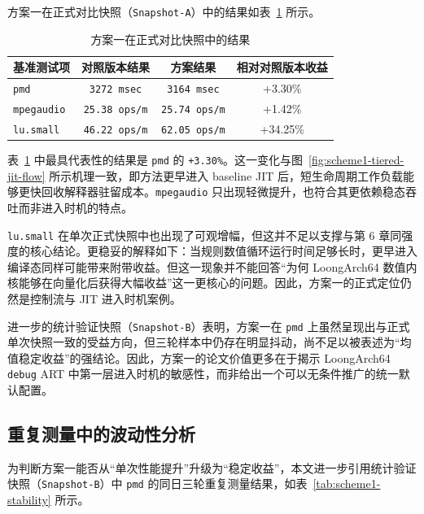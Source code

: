 方案一在正式对比快照（\texttt{Snapshot-A}）中的结果如表~\ref{tab:scheme1-result} 所示。

\begin{table}[htbp]
    \centering
    \small
    \caption{方案一在正式对比快照中的结果}
    \label{tab:scheme1-result}
    \begin{tabular}{lccc}
        \hline
        \textbf{基准测试项} & \textbf{对照版本结果} & \textbf{方案结果} & \textbf{相对对照版本收益} \\
        \hline
        \texttt{pmd} & \texttt{3272\,msec} & \texttt{3164\,msec} & +3.30\% \\
        \texttt{mpegaudio} & \texttt{25.38\,ops/m} & \texttt{25.74\,ops/m} & +1.42\% \\
        \texttt{lu.small} & \texttt{46.22\,ops/m} & \texttt{62.05\,ops/m} & +34.25\% \\
        \hline
    \end{tabular}
\end{table}

表~\ref{tab:scheme1-result} 中最具代表性的结果是 \texttt{pmd} 的 \texttt{+3.30\%}。这一变化与图~\ref{fig:scheme1-tiered-jit-flow} 所示机理一致，即方法更早进入 baseline JIT 后，短生命周期工作负载能够更快回收解释器驻留成本。\texttt{mpegaudio} 只出现轻微提升，也符合其更依赖稳态吞吐而非进入时机的特点。

\texttt{lu.small} 在单次正式快照中也出现了可观增幅，但这并不足以支撑与第 6 章同强度的核心结论。更稳妥的解释如下：当规则数值循环运行时间足够长时，更早进入编译态同样可能带来附带收益。但这一现象并不能回答“为何 LoongArch64 数值内核能够在向量化后获得大幅收益”这一更核心的问题。因此，方案一的正式定位仍然是控制流与 JIT 进入时机案例。

进一步的统计验证快照（\texttt{Snapshot-B}）表明，方案一在 \texttt{pmd} 上虽然呈现出与正式单次快照一致的受益方向，但三轮样本中仍存在明显抖动，尚不足以被表述为“均值稳定收益”的强结论。因此，方案一的论文价值更多在于揭示 LoongArch64 \texttt{debug} ART 中第一层进入时机的敏感性，而非给出一个可以无条件推广的统一默认配置。

\subsection{重复测量中的波动性分析}

为判断方案一能否从“单次性能提升”升级为“稳定收益”，本文进一步引用统计验证快照（\texttt{Snapshot-B}）中 \texttt{pmd} 的同日三轮重复测量结果，如表~\ref{tab:scheme1-stability} 所示。

